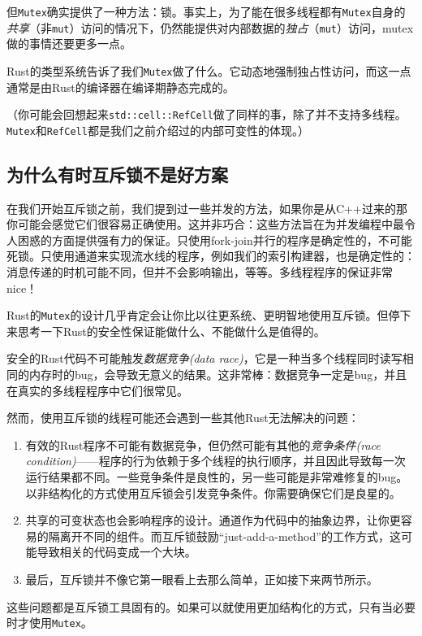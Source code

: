 但\texttt{Mutex}确实提供了一种方法：锁。事实上，为了能在很多线程都有\texttt{Mutex}自身的\emph{共享}（非\texttt{mut}）访问的情况下，仍然能提供对内部数据的\emph{独占}（\texttt{mut}）访问，mutex做的事情还要更多一点。

Rust的类型系统告诉了我们\texttt{Mutex}做了什么。它动态地强制独占性访问，而这一点通常是由Rust的编译器在编译期静态完成的。

（你可能会回想起来\texttt{std::cell::RefCell}做了同样的事，除了并不支持多线程。\texttt{Mutex}和\texttt{RefCell}都是我们之前介绍过的内部可变性的体现。）

\subsection{为什么有时互斥锁不是好方案}
在我们开始互斥锁之前，我们提到过一些并发的方法，如果你是从C++过来的那你可能会感觉它们很容易正确使用。这并非巧合：这些方法旨在为并发编程中最令人困惑的方面提供强有力的保证。只使用fork-join并行的程序是确定性的，不可能死锁。只使用通道来实现流水线的程序，例如我们的索引构建器，也是确定性的：消息传递的时机可能不同，但并不会影响输出，等等。多线程程序的保证非常nice！

Rust的\texttt{Mutex}的设计几乎肯定会让你比以往更系统、更明智地使用互斥锁。但停下来思考一下Rust的安全性保证能做什么、不能做什么是值得的。

安全的Rust代码不可能触发\emph{数据竞争(data race)}，它是一种当多个线程同时读写相同的内存时的bug，会导致无意义的结果。这非常棒：数据竞争一定是bug，并且在真实的多线程程序中它们很常见。

然而，使用互斥锁的线程可能还会遇到一些其他Rust无法解决的问题：
\begin{enumerate}
    \item 有效的Rust程序不可能有数据竞争，但仍然可能有其他的\emph{竞争条件(race condition)}——程序的行为依赖于多个线程的执行顺序，并且因此导致每一次运行结果都不同。一些竞争条件是良性的，另一些可能是非常难修复的bug。以非结构化的方式使用互斥锁会引发竞争条件。你需要确保它们是良星的。
    \item 共享的可变状态也会影响程序的设计。通道作为代码中的抽象边界，让你更容易的隔离开不同的组件。而互斥锁鼓励“just-add-a-method”的工作方式，这可能导致相关的代码变成一个大块。
    \item 最后，互斥锁并不像它第一眼看上去那么简单，正如接下来两节所示。
\end{enumerate}

这些问题都是互斥锁工具固有的。如果可以就使用更加结构化的方式，只有当必要时才使用\texttt{Mutex}。

